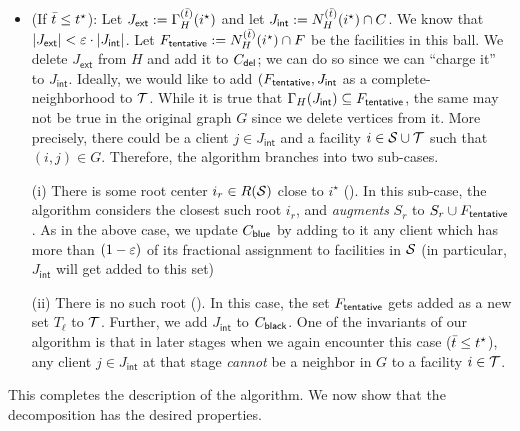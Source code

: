 \begin{itemize}
\item (If $\bar{t} \leq t^\star$): Let $J_\mathsf{ext} := \Gamma_H^{(\bar{t})}(i^\star)$ and let $J_\mathsf{int} := N_H^{(\bar{t})}(i^\star) \cap C$. We know that $|J_\mathsf{ext}| < \varepsilon\cdot |J_\mathsf{int}|$. 
Let $F_\mathsf{tentative} := N_H^{(\bar{t})}(i^\star) \cap F$ be the facilities in this ball. We delete $J_\mathsf{ext}$ from $H$ and add it to $C_{\mathsf{del}}$; we can do so since we can ``charge it'' to $J_\mathsf{int}$.
Ideally, we would like to add $(F_\mathsf{tentative},J_\mathsf{int}$ as a complete-neighborhood to ${\cal T}$.
While it is true that $\Gamma_H(J_\mathsf{int}) \subseteq F_\mathsf{tentative}$, the same may not be true in the original graph $G$ since we delete vertices from it. More precisely, there could be a client $j\in J_\mathsf{int}$ and a facility $i\in {\cal S}\cup{\cal T}$
such that $(i,j) \in G$. Therefore, the algorithm branches into two sub-cases.
%
%

(i) There is some root center  $i_r \in R({\cal S})$ close to $i^\star$ (). In  this
    sub-case, the algorithm considers the closest such root $i_r$, and {\em augments} $S_r$ to $S_r \cup F_\mathsf{tentative}$. As in the above case,
    we update $C_{\mathsf{blue}}$ by adding to it any client which has more than $(1-\varepsilon)$ of its fractional assignment to facilities in ${\cal S}$ (in particular, $J_\mathsf{int}$ will
    get added to this set) 
    
 (ii) There is no such root ().  In this case, the set $F_\mathsf{tentative}$ gets added as a new set $T_\ell$ to ${\cal T}$. Further,
    we add $J_\mathsf{int}$ to $C_{\mathsf{black}}$. One of the invariants of our algorithm is that in later stages when we again encounter this case ($\bar{t} \leq t^\star$), any client $j\in J_\mathsf{int}$ at that stage {\em cannot} be a neighbor in $G$ to a facility $i\in {\cal T}$.
    \end{itemize}

This completes the description of the algorithm. We now show that the decomposition has the desired properties.

